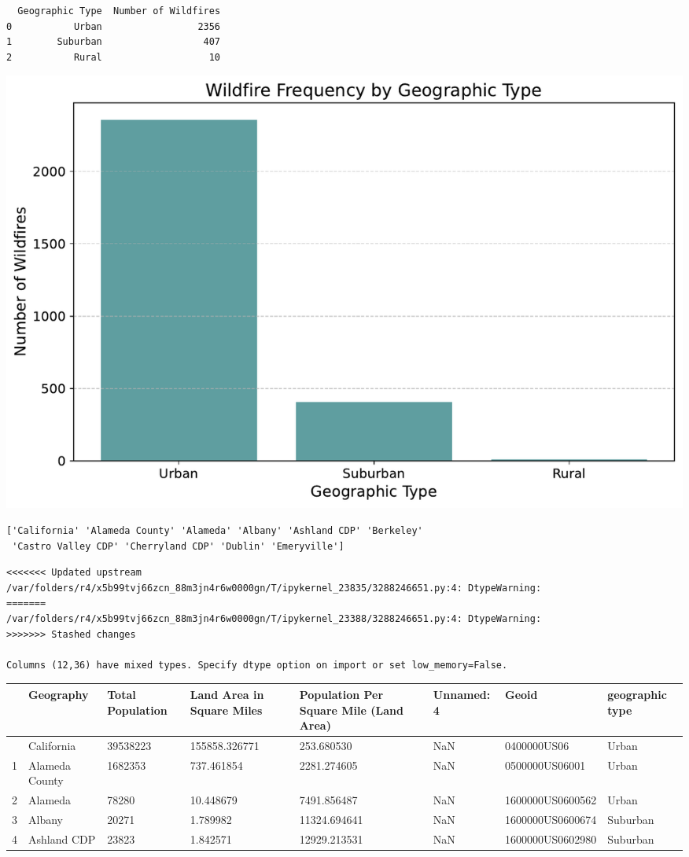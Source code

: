 \documentclass[
  letterpaper,
  DIV=11,
  numbers=noendperiod]{scrartcl}
\begin{document}
\begin{verbatim}
  Geographic Type  Number of Wildfires
0           Urban                 2356
1        Suburban                  407
2           Rural                   10
\end{verbatim}

\includegraphics{Final Writeup_files/figure-pdf/cell-7-output-2.pdf}

\begin{verbatim}
['California' 'Alameda County' 'Alameda' 'Albany' 'Ashland CDP' 'Berkeley'
 'Castro Valley CDP' 'Cherryland CDP' 'Dublin' 'Emeryville']
\end{verbatim}

\begin{verbatim}
<<<<<<< Updated upstream
/var/folders/r4/x5b99tvj66zcn_88m3jn4r6w0000gn/T/ipykernel_23835/3288246651.py:4: DtypeWarning:
=======
/var/folders/r4/x5b99tvj66zcn_88m3jn4r6w0000gn/T/ipykernel_23388/3288246651.py:4: DtypeWarning:
>>>>>>> Stashed changes

Columns (12,36) have mixed types. Specify dtype option on import or set low_memory=False.
\end{verbatim}

\begin{longtable}[]{@{}llllllll@{}}
\toprule\noalign{}
& Geography & Total Population & Land Area in Square Miles & Population
Per Square Mile (Land Area) & Unnamed: 4 & Geoid & geographic type \\
\midrule\noalign{}
\endhead
\bottomrule\noalign{}
\endlastfoot
0 & California & 39538223 & 155858.326771 & 253.680530 & NaN &
0400000US06 & Urban \\
1 & Alameda County & 1682353 & 737.461854 & 2281.274605 & NaN &
0500000US06001 & Urban \\
2 & Alameda & 78280 & 10.448679 & 7491.856487 & NaN & 1600000US0600562 &
Urban \\
3 & Albany & 20271 & 1.789982 & 11324.694641 & NaN & 1600000US0600674 &
Suburban \\
4 & Ashland CDP & 23823 & 1.842571 & 12929.213531 & NaN &
1600000US0602980 & Suburban \\
\end{longtable}
\end{document}
